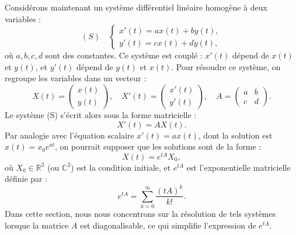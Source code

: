 Considérons maintenant un système différentiel linéaire homogène à deux variables :
\begin{equation}
(S) \quad
\begin{cases}
x'(t) = ax(t) + by(t), \\
y'(t) = cx(t) + dy(t),
\end{cases}
\end{equation}
où \( a, b, c, d \) sont des constantes. Ce système est couplé : \( x'(t) \) dépend de \( x(t) \) et \( y(t) \), et \( y'(t) \) dépend de \( y(t) \) et \( x(t) \). Pour résoudre ce système, on regroupe les variables dans un vecteur :
\[
X(t) = \begin{pmatrix} x(t) \\ y(t) \end{pmatrix}, \quad X'(t) = \begin{pmatrix} x'(t) \\ y'(t) \end{pmatrix}, \quad A = \begin{pmatrix} a & b \\ c & d \end{pmatrix}.
\]
Le système (S) s'écrit alors sous la forme matricielle :
\[
X'(t) = AX(t).
\]
Par analogie avec l'équation scalaire \( x'(t) = ax(t) \), dont la solution est \( x(t) = x_0 e^{at} \), on pourrait supposer que les solutions sont de la forme :
\[
X(t) = e^{tA} X_0,
\]
où \( X_0 \in \mathbb{R}^2 \) (ou \( \mathbb{C}^2 \)) est la condition initiale, et \( e^{tA} \) est l'exponentielle matricielle définie par :
\[
e^{tA} = \sum_{k=0}^\infty \frac{(tA)^k}{k!}.
\]
Dans cette section, nous nous concentrons sur la résolution de tels systèmes lorsque la matrice \( A \) est diagonalisable, ce qui simplifie l'expression de \( e^{tA} \).

